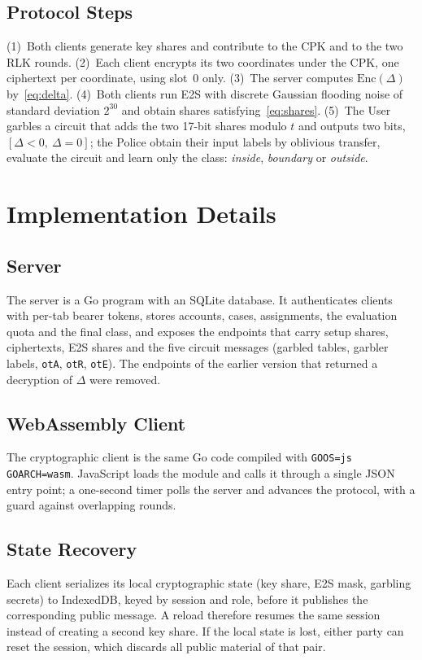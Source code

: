 \documentclass[conference,letterpaper]{IEEEtran}
\begin{document}
\subsection{Protocol Steps}
(1)~Both clients generate key shares and contribute to the CPK and to the two RLK rounds. (2)~Each client encrypts its two coordinates under the CPK, one ciphertext per coordinate, using slot~0 only. (3)~The server computes $\mathrm{Enc}(\Delta)$ by~\eqref{eq:delta}. (4)~Both clients run E2S with discrete Gaussian flooding noise of standard deviation $2^{30}$ and obtain shares satisfying~\eqref{eq:shares}. (5)~The User garbles a circuit that adds the two 17-bit shares modulo $t$ and outputs two bits, $[\Delta < 0,\ \Delta = 0]$; the Police obtain their input labels by oblivious transfer, evaluate the circuit and learn only the class: \emph{inside}, \emph{boundary} or \emph{outside}.

\section{Implementation Details}
\subsection{Server}
The server is a Go program with an SQLite database. It authenticates clients with per-tab bearer tokens, stores accounts, cases, assignments, the evaluation quota and the final class, and exposes the endpoints that carry setup shares, ciphertexts, E2S shares and the five circuit messages (garbled tables, garbler labels, \texttt{otA}, \texttt{otR}, \texttt{otE}). The endpoints of the earlier version that returned a decryption of $\Delta$ were removed.

\subsection{WebAssembly Client}
The cryptographic client is the same Go code compiled with \texttt{GOOS=js GOARCH=wasm}. JavaScript loads the module and calls it through a single JSON entry point; a one-second timer polls the server and advances the protocol, with a guard against overlapping rounds.

\subsection{State Recovery}
Each client serializes its local cryptographic state (key share, E2S mask, garbling secrets) to IndexedDB, keyed by session and role, before it publishes the corresponding public message. A reload therefore resumes the same session instead of creating a second key share. If the local state is lost, either party can reset the session, which discards all public material of that pair.
\end{document}
